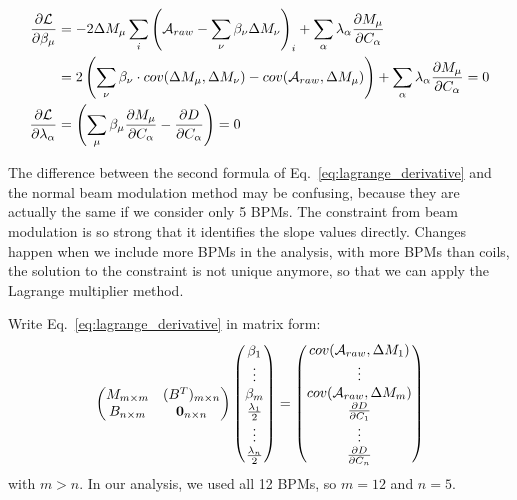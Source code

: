 \begin{equation}
    \begin{aligned}
	\frac{\partial \mathcal{L}}{\partial \beta_\mu} &= -2\Delta M_\mu \sum_i \left( \mathcal{A}_{raw} - \sum_\nu \beta_\nu \Delta M_\nu \right)_i + \sum_\alpha \lambda_\alpha \frac{\partial M_\mu}{\partial C_\alpha}    \\
	    &= 2 \left(\sum_\nu \beta_\nu \cdot cov(\Delta M_\mu, \Delta M_\nu) - cov(\mathcal{A}_{raw}, \Delta M_\mu) \right) + \sum_\alpha \lambda_\alpha \frac{\partial M_\mu}{\partial C_\alpha} = 0  \\
	\frac{\partial \mathcal{L}}{\partial \lambda_\alpha} &= \left( \sum_\mu \beta_\mu \frac{\partial M_\mu}{\partial C_\alpha} - \frac{\partial D}{\partial C_\alpha} \right) = 0\\
    \end{aligned}
    \label{eq:lagrange_derivative}
\end{equation}

The difference between the second formula of Eq.~\ref{eq:lagrange_derivative} and
the normal beam modulation method may be confusing, because they are actually
the same if we consider only 5 BPMs. The constraint from beam modulation is so 
strong that it identifies the slope values directly. Changes happen when we
include more BPMs in the analysis, with more BPMs than coils, the solution
to the constraint is not unique anymore, so that we can apply the Lagrange multiplier
method.

Write Eq.~\ref{eq:lagrange_derivative} in matrix form:
\begin{equation}
    \begin{pmatrix}
	M_{m\times m}	& (B^T)_{m\times n}	\\
	B_{n \times m}  & \bm{0}_{n\times n}   \\
    \end{pmatrix}
    \begin{pmatrix}
	\beta_1	\\
	\vdots	\\
	\beta_m	\\
	\frac{\lambda_1}{2} \\
	\vdots	\\
	\frac{\lambda_n}{2} \\
    \end{pmatrix}
    =
    \begin{pmatrix}
	cov(\mathcal{A}_{raw}, \Delta M_1)  \\
	\vdots	\\
	cov(\mathcal{A}_{raw}, \Delta M_m)  \\
	\frac{\partial D}{\partial C_1}	\\
	\vdots	\\
	\frac{\partial D}{\partial C_n}	\\
    \end{pmatrix}
    \label{eq:lagrange_derivative_1}
\end{equation}
with $m > n$. In our analysis, we used all 12 BPMs, so $m = 12$ and $n = 5$.

